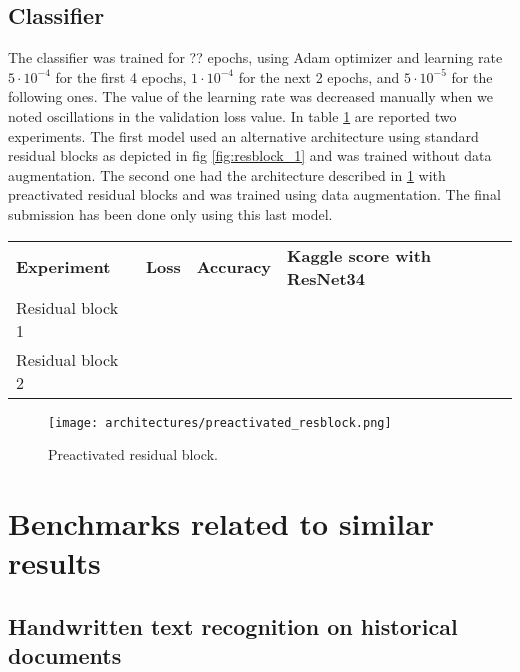 \subsection{Classifier}
\label{ssec:classifierexp}

The classifier was trained for ?? epochs, using Adam optimizer and learning rate $5 \cdot 10^{-4}$ for the first 4 epochs, $1 \cdot 10^{-4}$ for the next 2 epochs, and $5 \cdot 10^{-5}$ for the following ones. The value of the learning rate was decreased manually when we noted oscillations in the validation loss value. In table \ref{tab:class_res} are reported two experiments. The first model used an alternative architecture using standard residual blocks as depicted in fig \ref{fig:resblock_1} and was trained without data augmentation. The second one had the architecture described in \ref{fig:preact_resblock} with preactivated residual blocks and was trained using data augmentation. The final submission has been done only using this last model.

\begin{table}[h]
	\begin{tabular}{llll}
		\rowcolor[HTML]{EFEFEF} 
		\textbf{Experiment} & \textbf{Loss} & \textbf{Accuracy} & \textbf{Kaggle score with ResNet34} \\
		Residual block 1    &               &                   &                                     \\
		Residual block 2    &               &                   &                                    
	\end{tabular}
	\label{tab:class_res}
\end{table}

\begin{figure}[h]
	\caption{Preactivated residual block.}
	\centering
	\texttt{[image: architectures/preactivated\_resblock.png]}
	\label{fig:preact_resblock}
\end{figure}

\section{Benchmarks related to similar results}
\label{sec:stateofart}

\subsection{Handwritten text recognition on historical documents}
\label{ssec:historicaldocuments}

